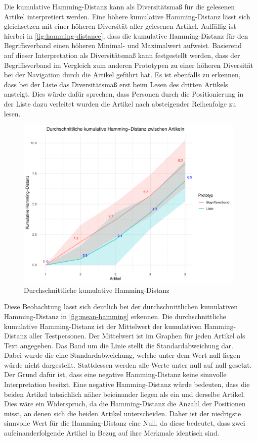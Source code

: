 Die kumulative Hamming-Distanz kann als Diversitätsmaß für die gelesenen Artikel interpretiert werden.
Eine höhere kumulative Hamming-Distanz lässt sich gleichsetzen mit einer höheren Diversität aller gelesenen Artikel.
Auffällig ist hierbei in \autoref{fig:hamming-distance}, dass die kumulative Hamming-Distanz für den Begriffsverband einen höheren Minimal- und Maximalwert aufweist.
Basierend auf dieser Interpretation als Diversitätsmaß kann festgestellt werden, dass der Begriffsverband im Vergleich zum anderen Prototypen zu einer höheren Diversität bei der Navigation durch die Artikel geführt hat.
Es ist ebenfalls zu erkennen, dass bei der Liste das Diversitätsmaß erst beim Lesen des dritten Artikels ansteigt.
Dies würde dafür sprechen, dass Personen durch die Positionierung in der Liste dazu verleitet wurden die Artikel nach absteigender Reihenfolge zu lesen.

\begin{figure}[!ht]
    \centering
    \includegraphics[width=0.8\columnwidth]{figures/comparison-line.pdf}
    \caption{\label{fig:mean-hamming}Durchschnittliche kumulative Hamming-Distanz}
\end{figure}

Diese Beobachtung lässt sich deutlich bei der durchschnittlichen kumulativen Hamming-Distanz in \autoref{fig:mean-hamming} erkennen.
Die durchschnittliche kumulative Hamming-Distanz ist der Mittelwert der kumulativen Hamming-Distanz aller Testpersonen.
Der Mittelwert ist im Graphen für jeden Artikel als Text angegeben.
Das Band um die Linie stellt die Standardabweichung dar.
Dabei wurde die eine Standardabweichung, welche unter dem Wert null liegen würde nicht dargestellt.
Stattdessen werden alle Werte unter null auf null gesetzt.
Der Grund dafür ist, dass eine negative Hamming-Distanz keine sinnvolle Interpretation besitzt.
Eine negative Hamming-Distanz würde bedeuten, dass die beiden Artikel tatsächlich näher beieinander liegen als ein und derselbe Artikel.
Dies wäre ein Widerspruch, da die Hamming-Distanz die Anzahl der Positionen misst, an denen sich die beiden Artikel unterscheiden.
Daher ist der niedrigste sinnvolle Wert für die Hamming-Distanz eine Null, da diese bedeutet, dass zwei aufeinanderfolgende Artikel in Bezug auf ihre Merkmale identisch sind.\\

